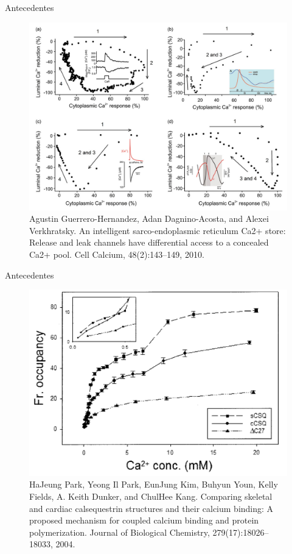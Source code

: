 \begin{frame}{Antecedentes}
	
	\begin{figure}[h]
		\includegraphics[width=.9\textwidth]{FIGURA2}
		\caption{{\tiny Agustin Guerrero-Hernandez, Adan Dagnino-Acosta, and Alexei Verkhratsky. An intelligent
				sarco-endoplasmic reticulum Ca2+ store: Release and leak channels have differential access
				to a concealed Ca2+ pool. Cell Calcium, 48(2):143–149, 2010.}}
	\end{figure}
	
\end{frame}

\begin{frame}{Antecedentes}
	
	\begin{figure}[h]
		\includegraphics[width=.8\textwidth]{FIGURA9}
		\caption{{\tiny HaJeung Park, Yeong Il Park, EunJung Kim, Buhyun Youn, Kelly Fields, A. Keith Dunker, and
				ChulHee Kang. Comparing skeletal and cardiac calsequestrin structures and their calcium
				binding: A proposed mechanism for coupled calcium binding and protein polymerization.
				Journal of Biological Chemistry, 279(17):18026–18033, 2004.}}
	\end{figure}
	
\end{frame}

